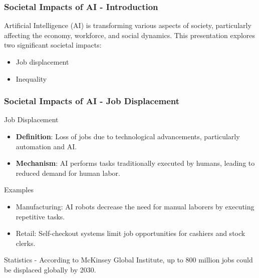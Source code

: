 \documentclass{beamer}
\begin{document}
\begin{frame}[fragile]
    \frametitle{Societal Impacts of AI - Introduction}
    Artificial Intelligence (AI) is transforming various aspects of society, particularly affecting the economy, workforce, and social dynamics. 
    This presentation explores two significant societal impacts:
    \begin{itemize}
        \item Job displacement
        \item Inequality
    \end{itemize}
\end{frame}

\begin{frame}[fragile]
    \frametitle{Societal Impacts of AI - Job Displacement}
    \begin{block}{Job Displacement}
        \begin{itemize}
            \item \textbf{Definition}: Loss of jobs due to technological advancements, particularly automation and AI.
            \item \textbf{Mechanism}: AI performs tasks traditionally executed by humans, leading to reduced demand for human labor.
        \end{itemize}
    \end{block}
    
    \begin{block}{Examples}
        \begin{itemize}
            \item Manufacturing: AI robots decrease the need for manual laborers by executing repetitive tasks.
            \item Retail: Self-checkout systems limit job opportunities for cashiers and stock clerks.
        \end{itemize}
    \end{block}

    \begin{block}{Statistics}
        - According to McKinsey Global Institute, up to 800 million jobs could be displaced globally by 2030.
    \end{block}
\end{frame}
\end{document}
